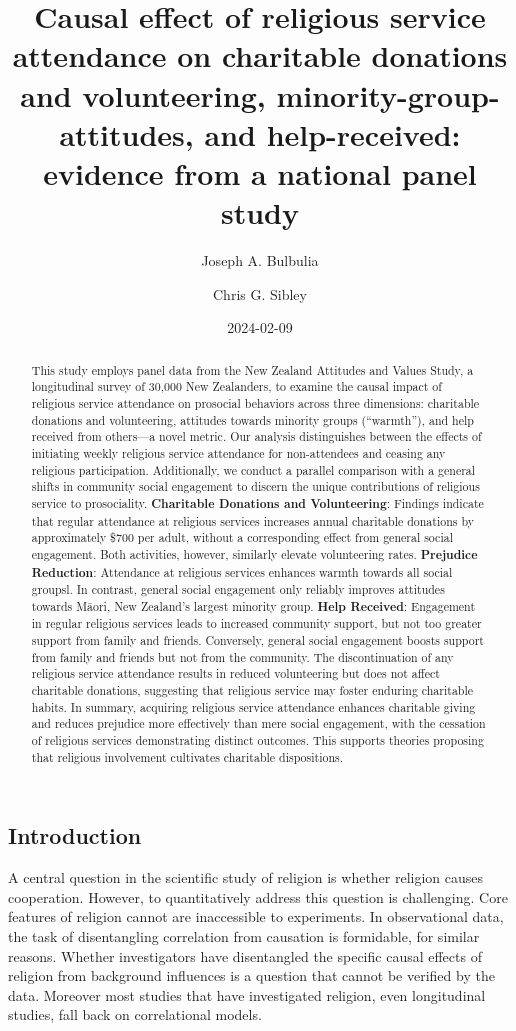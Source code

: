 \documentclass[
  singlecolumn]{article}
\title{Causal effect of religious service attendance on charitable
donations and volunteering, minority-group-attitudes, and help-received:
evidence from a national panel study}
\author{Joseph A. Bulbulia \and Chris G. Sibley}
\date{2024-02-09}
\begin{document}
\maketitle
\begin{abstract}
This study employs panel data from the New Zealand Attitudes and Values
Study, a longitudinal survey of 30,000 New Zealanders, to examine the
causal impact of religious service attendance on prosocial behaviors
across three dimensions: charitable donations and volunteering,
attitudes towards minority groups (``warmth''), and help received from
others---a novel metric. Our analysis distinguishes between the effects
of initiating weekly religious service attendance for non-attendees and
ceasing any religious participation. Additionally, we conduct a parallel
comparison with a general shifts in community social engagement to
discern the unique contributions of religious service to prosociality.
\textbf{Charitable Donations and Volunteering}: Findings indicate that
regular attendance at religious services increases annual charitable
donations by approximately \$700 per adult, without a corresponding
effect from general social engagement. Both activities, however,
similarly elevate volunteering rates. \textbf{Prejudice Reduction}:
Attendance at religious services enhances warmth towards all social
groupsl. In contrast, general social engagement only reliably improves
attitudes towards Māori, New Zealand's largest minority group.
\textbf{Help Received}: Engagement in regular religious services leads
to increased community support, but not too greater support from family
and friends. Conversely, general social engagement boosts support from
family and friends but not from the community. The discontinuation of
any religious service attendance results in reduced volunteering but
does not affect charitable donations, suggesting that religious service
may foster enduring charitable habits. In summary, acquiring religious
service attendance enhances charitable giving and reduces prejudice more
effectively than mere social engagement, with the cessation of religious
services demonstrating distinct outcomes. This supports theories
proposing that religious involvement cultivates charitable dispositions.
\end{abstract}

\subsection{Introduction}\label{introduction}

A central question in the scientific study of religion is whether
religion causes cooperation. However, to quantitatively address this
question is challenging. Core features of religion cannot are
inaccessible to experiments. In observational data, the task of
disentangling correlation from causation is formidable, for similar
reasons. Whether investigators have disentangled the specific causal
effects of religion from background influences is a question that cannot
be verified by the data. Moreover most studies that have investigated
religion, even longitudinal studies, fall back on correlational models.
\end{document}
